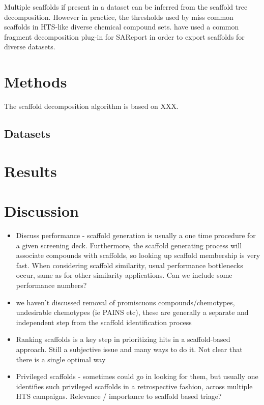 \documentclass[journal=jacsat,manuscript=article]{achemso}
\begin{document}
Multiple scaffolds if present in a dataset can be inferred from the scaffold tree decomposition\cite{ClarkLabute2008SAReport}. However in practice, the thresholds used by \citeauthor{ClarkLabute2008SAReport} miss common scaffolds in HTS-like diverse chemical compound sets. \citeauthor{Bandyopadhyay2011ACS} have used a common fragment decomposition plug-in for SAReport in order to export scaffolds for diverse datasets.   

\section{Methods}
\label{sec:methods}

The scaffold decomposition algorithm is based on XXX. 

\subsection{Datasets}
\label{sec:datasets}

\section{Results}

\section{Discussion}
\label{sec:discussion}

\begin{itemize}
\item Discuss performance - scaffold generation is usually a one time procedure for a given screening deck. Furthermore, the scaffold generating process will associate compounds with scaffolds, so looking up scaffold membership is very fast. When considering scaffold similarity, usual performance bottlenecks occur, same as for other similarity applications. Can we include some performance numbers?
\item we haven't discussed removal of promiscuous compounds/chemotypes, undesirable chemotypes (ie PAINS etc), these are generally a separate and independent step from the scaffold identification process
\item Ranking scaffolds is a key step in prioritizing hits in a scaffold-based approach. Still a subjective issue and many ways to do it. Not clear that there is a single optimal way
\item Privileged scaffolds - sometimes could go in looking for them, but usually one identifies such privileged scaffolds in a retrospective fashion, across multiple HTS campaigns. Relevance / importance to scaffold based triage?
\end{itemize}
\end{document}
